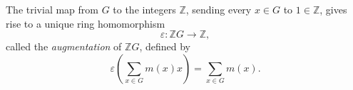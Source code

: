 The trivial map from $G$ to the integers $\mathbb{Z}$, sending every $x \in G$ to $1 \in \mathbb{Z}$, gives rise to a unique ring homomorphism
$$\varepsilon: \mathbb{Z}G \to \mathbb{Z},$$
called the \emph{augmentation} of $\mathbb{Z}G$, defined by
$$\varepsilon\!\left( \sum_{x \in G} m(x) x \right) = \sum_{x \in G} m(x).$$
